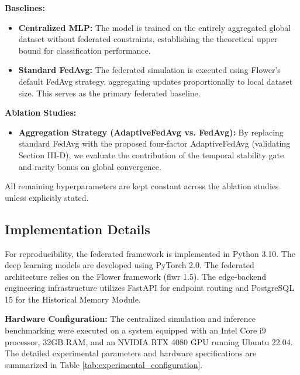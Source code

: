 \textbf{Baselines:}
\begin{itemize}
    \item \textbf{Centralized MLP:} The model is trained on the entirely aggregated global dataset without federated constraints, establishing the theoretical upper bound for classification performance.
    \item \textbf{Standard FedAvg:} The federated simulation is executed using Flower's default FedAvg strategy, aggregating updates proportionally to local dataset size. This serves as the primary federated baseline.
\end{itemize}

\textbf{Ablation Studies:}
\begin{itemize}
    \item \textbf{Aggregation Strategy (AdaptiveFedAvg vs. FedAvg):} By replacing standard FedAvg with the proposed four-factor AdaptiveFedAvg (validating Section III-D), we evaluate the contribution of the temporal stability gate and rarity bonus on global convergence.
\end{itemize}

All remaining hyperparameters are kept constant across the ablation studies unless explicitly stated.

\subsection{Implementation Details}

For reproducibility, the federated framework is implemented in Python 3.10. The deep learning models are developed using PyTorch 2.0. The federated architecture relies on the Flower framework (flwr 1.5). The edge-backend engineering infrastructure utilizes FastAPI for endpoint routing and PostgreSQL 15 for the Historical Memory Module.

\textbf{Hardware Configuration:}
The centralized simulation and inference benchmarking were executed on a system equipped with an Intel Core i9 processor, 32GB RAM, and an NVIDIA RTX 4080 GPU running Ubuntu 22.04. The detailed experimental parameters and hardware specifications are summarized in Table \ref{tab:experimental_configuration}.


